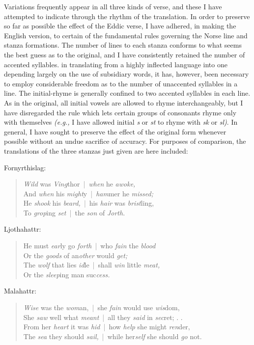\documentclass{scrbook}
\newcommand{\myverse}[1]{
	{\stanzafont
		\begin{verse}
		#1
		\end{verse}
	}
}
\newcommand{\sep}{\textcolor{gray}{~|~}}
\begin{document}
Variations frequently appear in all three kinds of verse, and these I have attempted to indicate through the rhythm of the translation. In order to preserve so far as possible the effect of the Eddic verse, I have adhered, in making the English version, to certain of the fundamental rules governing the Norse line and stanza formations. The number of lines to each stanza conforms to what seems the best guess as to the original, and I have consistently retained the number of accented syllables. in translating from a highly inflected language into one depending largely on the use of subsidiary words, it has, however, been necessary to employ considerable freedom as to the number of unaccented syllables in a line. The initial-rhyme is generally confined to two accented syllables in each line. As in the original, all initial vowels are allowed to rhyme interchangeably, but I have disregarded the rule which lets certain groups of consonants rhyme only with themselves \emph{(e.g.,} I have allowed initial \emph{s} or \emph{st} to rhyme with \emph{sk} or \emph{sl)}. In general, I have sought to preserve the effect of the original form whenever possible without an undue sacrifice of accuracy. For purposes of comparison, the translations of the three stanzas just given are here included:

Fornyrthislag:

\myverse{
\textit{Wild} was \textit{Ving}thor{\sep}\textit{when} he \textit{awoke,} \\
And \textit{when} his \textit{might}y{\sep}\textit{ham}mer he \textit{missed;} \\
He \textit{shook} his \textit{beard,}{\sep}his \textit{hair} was \textit{brist}ling, \\
To \textit{grop}ing \textit{set}{\sep}the \textit{son} of \textit{Jorth.}
}

Ljothahattr:

\myverse{
He must \textit{ear}ly go \textit{forth}{\sep}who \textit{fain} the \textit{blood} \\
Or the \textit{goods} of an\textit{other} would \textit{get;} \\
The \textit{wolf} that lies \textit{id}le{\sep}shall \textit{win} little \textit{meat,} \\
Or the \textit{sleep}ing man suc\textit{cess.}
}

Malahattr:

\myverse{
\textit{Wise} was the \textit{wom}an,{\sep}she \textit{fain} would use \textit{wis}dom, \\
She \textit{saw} well what \textit{meant}{\sep}all they \textit{said} in \textit{sec}ret; . . \\
From her \textit{heart} it was \textit{hid}{\sep}how \textit{help} she might \textit{ren}der, \\
The \textit{sea} they should \textit{sail,}{\sep}while her\textit{self} she should \textit{go} not.
}
\end{document}
